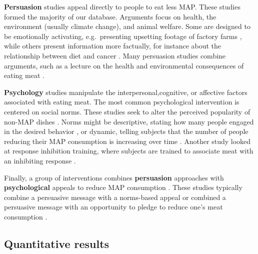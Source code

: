 \documentclass[sn-nature,referee,pdflatex]{sn-jnl}
\begin{document}
\textbf{Persuasion} studies
\citep{kanchanachitra2020, abrahamse2007, acharya2004, banerjee2019, bianchi2022, bochmann2017, bschaden2020, carfora2023, hennessy2016, piester2020, cooney2014, cooney2016, feltz2022, haile2021, hatami2018, jalil2023, mathur2021effectiveness, merrill2009, norris2014, peacock2017, polanco2022, sparkman2021, weingarten2022}
appeal directly to people to eat less MAP. These studies formed the
majority of our database. Arguments focus on health, the environment
(usually climate change), and animal welfare. Some are designed to be
emotionally activating, e.g.~presenting upsetting footage of factory
farms \citep{polanco2022}, while others present information more
factually, for instance about the relationship between diet and cancer
\citep{hatami2018}. Many persuasion studies combine arguments, such as a
lecture on the health and environmental consequences of eating meat
\citep{jalil2023}.

\textbf{Psychology} studies
\citep{aldoh2023, allen2002, camp2019, coker2022, piester2020, sparkman2020}
manipulate the interpersonal,cognitive, or affective factors associated
with eating meat. The most common psychological intervention is centered
on social norms. These studies seek to alter the perceived popularity of
non-MAP dishes \citep{sparkman2020}. Norms might be descriptive, stating
how many people engaged in the desired behavior \citep{aldoh2023}, or
dynamic, telling subjects that the number of people reducing their MAP
consumption is increasing over time
\citep{aldoh2023, coker2022, sparkman2020}. Another study looked at
response inhibition training, where subjects are trained to associate
meat with an inhibiting response \citep{camp2019}.

\begin{comment}
The first psychology study meeting our inclusion criteria was published in 2017.
\end{comment}

Finally, a group of interventions combines \textbf{persuasion}
approaches with \textbf{psychological} appeals to reduce MAP consumption
\citep{berndsen2005, bertolaso2015, carfora2023, fehrenbach2015, hennessy2016, mathur2021effectiveness, mattson2020, piester2020, shreedhar2021}.
These studies typically combine a persuasive message with a norms-based
appeal \citep{piester2020, mattson2020} or combined a persuasive message
with an opportunity to pledge to reduce one's meat consumption
\citep{mathur2021effectiveness, shreedhar2021}.

\subsection{Quantitative results}\label{quantitative-results}
\end{document}
